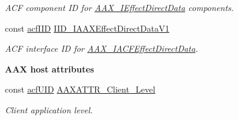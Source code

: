 \begin{Indent}
\begin{DoxyCompactItemize}
\begin{DoxyCompactList}\small\item\em A\+CF component ID for \mbox{\hyperlink{a01817}{A\+A\+X\+\_\+\+I\+Effect\+Direct\+Data}} components. \end{DoxyCompactList}\item 
const \mbox{\hyperlink{a00269_a59df0b41744eee7a066787aaedf97f67}{acf\+I\+ID}} \mbox{\hyperlink{a00683_a656fd18bfe63b2578f8ea56f34616613}{I\+I\+D\+\_\+\+I\+A\+A\+X\+Effect\+Direct\+Data\+V1}}
\begin{DoxyCompactList}\small\item\em A\+CF interface ID for \mbox{\hyperlink{a01661}{A\+A\+X\+\_\+\+I\+A\+C\+F\+Effect\+Direct\+Data}}. \end{DoxyCompactList}\end{DoxyCompactItemize}
\end{Indent}
\begin{Indent}\textbf{ A\+AX host attributes}\par
\begin{DoxyCompactItemize}
\item 
const \mbox{\hyperlink{a00269_ab19414382287ff80930c48a196145214}{acf\+U\+ID}} \mbox{\hyperlink{a00683_a1bbc82d62cf23079e92826874381a891}{A\+A\+X\+A\+T\+T\+R\+\_\+\+Client\+\_\+\+Level}}
\begin{DoxyCompactList}\small\item\em Client application level. \end{DoxyCompactList}\end{DoxyCompactItemize}
\end{Indent}
